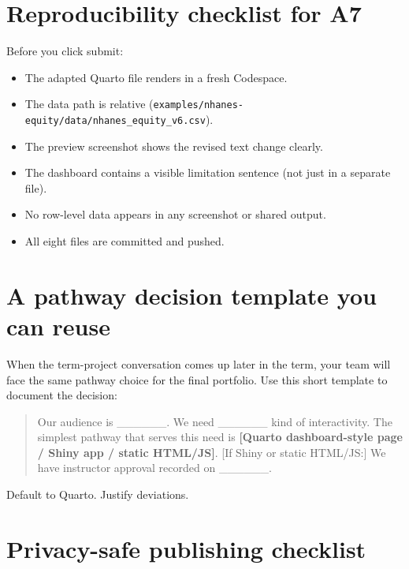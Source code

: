\documentclass[
  letterpaper,
  DIV=11,
  numbers=noendperiod,
  oneside]{scrreprt}
\providecommand{\tightlist}{%
  \setlength{\itemsep}{0pt}\setlength{\parskip}{0pt}}
\begin{document}
\section*{Reproducibility checklist for
A7}\label{reproducibility-checklist-for-a7}


Before you click submit:

\begin{itemize}
\tightlist
\item
  The adapted Quarto file renders in a fresh Codespace.
\item
  The data path is relative
  (\texttt{examples/nhanes-equity/data/nhanes\_equity\_v6.csv}).
\item
  The preview screenshot shows the revised text change clearly.
\item
  The dashboard contains a visible limitation sentence (not just in a
  separate file).
\item
  No row-level data appears in any screenshot or shared output.
\item
  All eight files are committed and pushed.
\end{itemize}

\section*{A pathway decision template you can
reuse}\label{a-pathway-decision-template-you-can-reuse}


When the term-project conversation comes up later in the term, your team
will face the same pathway choice for the final portfolio. Use this
short template to document the decision:

\begin{quote}
Our audience is \_\_\_\_\_\_. We need \_\_\_\_\_\_ kind of
interactivity. The simplest pathway that serves this need is
\textbf{{[}Quarto dashboard-style page / Shiny app / static HTML/JS{]}}.
{[}If Shiny or static HTML/JS:{]} We have instructor approval recorded
on \_\_\_\_\_\_.
\end{quote}

Default to Quarto. Justify deviations.

\section*{Privacy-safe publishing
checklist}\label{privacy-safe-publishing-checklist}
\end{document}
